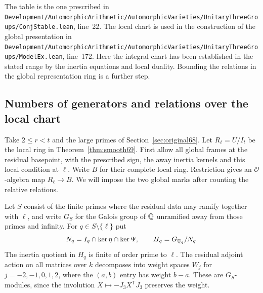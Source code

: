 \documentclass[a4paper,11pt]{article}
\theoremstyle{definition}
\theoremstyle{remark}
\newcommand{\srcloc}[2]{{\small\nolinkurl{#1.lean}}, line~#2}
\numberwithin{equation}{section}
\newcommand{\OO}{\mathcal O}
\begin{document}
The table is the one prescribed in
\srcloc{Development/AutomorphicArithmetic/AutomorphicVarieties/UnitaryThreeGroups/ConjStable}{22}.
The local chart is used in the construction of the global
presentation in
\srcloc{Development/AutomorphicArithmetic/AutomorphicVarieties/UnitaryThreeGroups/ModelEx}{172}.
Here the integral chart has been established in the stated range
by the inertia equations and local duality. Bounding the relations
in the global representation ring is a further step.

\subsection{Numbers of generators and relations over the local chart}\label{nav:IV-15}
\label{sec:rel70}

Take \(2\le r<t\) and the large primes of
Section~\ref{sec:original68}. Let \(R_\ell=U/I_t\) be the local
ring in Theorem~\ref{thm:smooth69}. First allow all global frames
at the residual basepoint, with the prescribed sign, the away
inertia kernels and this local condition at \(\ell\). Write
\(B\) for their complete local ring. Restriction gives an
\(\OO\)-algebra map \(R_\ell\to B\). We will impose the two
global marks after counting the relative relations.

Let \(S\) consist of the finite primes where the residual data
may ramify together with \(\ell\), and write \(G_S\) for the
Galois group of \(\mathbb Q\) unramified away from those primes and
infinity. For \(q\in S\setminus\{\ell\}\) put
\[
  N_q=I_q\cap\ker\eta\cap\ker\Psi,\qquad H_q=G_{\mathbb Q_q}/N_q .
\]
The inertia quotient in \(H_q\) is finite of order prime to
\(\ell\). The residual adjoint action on all matrices over \(k\)
decomposes into weight spaces \(W_j\) for
\(j=-2,-1,0,1,2\), where the \((a,b)\) entry has weight \(b-a\).
These are \(G_S\)-modules, since the involution
\(X\mapsto-J_3 X^{\mathsf T} J_3\) preserves the weight.
\end{document}
